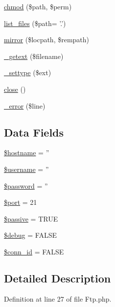 \begin{DoxyCompactItemize}
\item 
\hyperlink{class_c_i___f_t_p_a9af83eefaf53c7362e7108d1f82bf1ab}{chmod} (\$path, \$perm)
\item 
\hyperlink{class_c_i___f_t_p_a4a8692d7ea935946366a916a3013652e}{list\-\_\-files} (\$path= '.')
\item 
\hyperlink{class_c_i___f_t_p_aea2de30bbdf050cb607bbc5a36772bf3}{mirror} (\$locpath, \$rempath)
\item 
\hyperlink{class_c_i___f_t_p_ab06ef33f96f03cafbb8f2bb6d695ef1f}{\-\_\-getext} (\$filename)
\item 
\hyperlink{class_c_i___f_t_p_aacd9d6628615078d8df9aab1fe70e391}{\-\_\-settype} (\$ext)
\item 
\hyperlink{class_c_i___f_t_p_aa69c8bf1f1dcf4e72552efff1fe3e87e}{close} ()
\item 
\hyperlink{class_c_i___f_t_p_ac618e7d56614851d2c54aa096e1bcace}{\-\_\-error} (\$line)
\end{DoxyCompactItemize}
\subsection*{Data Fields}
\begin{DoxyCompactItemize}
\item 
\hyperlink{class_c_i___f_t_p_a8bf9ffb42ed554b203b55377d1fc9aa4}{\$hostname} = ''
\item 
\hyperlink{class_c_i___f_t_p_a0eb82aa5f81cf845de4b36cd653c42cf}{\$username} = ''
\item 
\hyperlink{class_c_i___f_t_p_a607686ef9f99ea7c42f4f3dd3dbb2b0d}{\$password} = ''
\item 
\hyperlink{class_c_i___f_t_p_aa0787efab4b22e8a212882f3409d4c77}{\$port} = 21
\item 
\hyperlink{class_c_i___f_t_p_a9fb61732ea9189fa2be5574ad3576d9c}{\$passive} = T\-R\-U\-E
\item 
\hyperlink{class_c_i___f_t_p_a85ae3e64cd40e9564adceb010085e9dd}{\$debug} = F\-A\-L\-S\-E
\item 
\hyperlink{class_c_i___f_t_p_a16c23f1dcbfed2f2759f5e54f604106d}{\$conn\-\_\-id} = F\-A\-L\-S\-E
\end{DoxyCompactItemize}


\subsection{Detailed Description}


Definition at line 27 of file Ftp.\-php.



